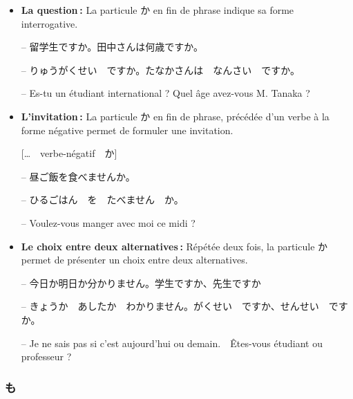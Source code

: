     \begin{itemize}
        \item \textbf{La question :} La particule か en fin de phrase indique sa forme interrogative. 
        
        \begin{tcolorbox}
            -- 留学生ですか。田中さんは何歳ですか。

            -- りゅうがくせい　ですか。たなかさんは　なんさい　ですか。

            -- Es-tu un étudiant international ? Quel âge avez-vous M. Tanaka ?
        \end{tcolorbox}
       
        \item \textbf{L'invitation :} La particule か en fin de phrase, précédée d'un verbe à la forme négative permet de formuler une invitation.
        
        \begin{center}
            [\dots　verbe-négatif　か]
        \end{center}

        \begin{tcolorbox}
            -- 昼ご飯を食べませんか。

            -- ひるごはん　を　たべません　か。

            -- Voulez-vous manger avec moi ce midi ?
        \end{tcolorbox}

        \item \textbf{Le choix entre deux alternatives :} Répétée deux fois, la particule か permet de présenter un choix entre deux alternatives.
        
        \begin{tcolorbox}
            -- 今日か明日か分かりません。学生ですか、先生ですか

            -- きょうか　あしたか　わかりません。がくせい　ですか、せんせい　ですか。

            -- Je ne sais pas si c'est aujourd'hui ou demain.　Êtes-vous étudiant ou professeur ?
        \end{tcolorbox}
    \end{itemize}

        \subsubsection{も}

